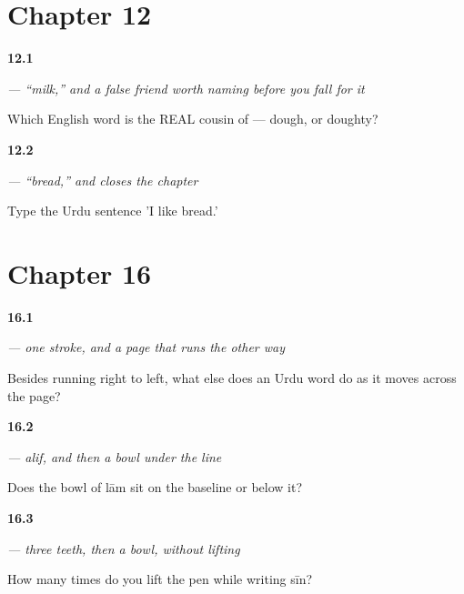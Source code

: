 \section*{Chapter 12}

\noindent\begin{minipage}[t]{\linewidth}
\raggedright
\hypertarget{review-UR-C12-doodh-false-friend}{\textbf{12.1}} \emph{ — \textquotedblleft{}milk,\textquotedblright{} and a false friend worth naming before you fall for it}\par
\small Which English word is the REAL cousin of  — dough, or doughty?
\end{minipage}\par\medskip

\noindent\begin{minipage}[t]{\linewidth}
\raggedright
\hypertarget{review-UR-C12-roti-pasand}{\textbf{12.2}} \emph{ — \textquotedblleft{}bread,\textquotedblright{} and  closes the chapter}\par
\small Type the Urdu sentence 'I like bread.'
\end{minipage}\par\medskip

\section*{Chapter 16}

\noindent\begin{minipage}[t]{\linewidth}
\raggedright
\hypertarget{review-UR-W16-alef-cascade}{\textbf{16.1}} \emph{ — one stroke, and a page that runs the other way}\par
\small Besides running right to left, what else does an Urdu word do as it moves across the page?
\end{minipage}\par\medskip

\noindent\begin{minipage}[t]{\linewidth}
\raggedright
\hypertarget{review-UR-W16-lam-bowl}{\textbf{16.2}} \emph{ — alif, and then a bowl under the line}\par
\small Does the bowl of lām sit on the baseline or below it?
\end{minipage}\par\medskip

\noindent\begin{minipage}[t]{\linewidth}
\raggedright
\hypertarget{review-UR-W16-sin-lifts}{\textbf{16.3}} \emph{ — three teeth, then a bowl, without lifting}\par
\small How many times do you lift the pen while writing sīn?
\end{minipage}\par\medskip

